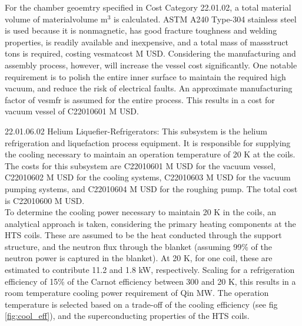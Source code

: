 For the chamber geoemtry specified in Cost Category 22.01.02, a total material volume of materialvolume m$^3$ is calculated. ASTM A240 Type-304 stainless steel is used because it is nonmagnetic, has good fracture toughness and welding properties, is readily available and inexpensive, and a total mass of massstruct tons is required, costing vesmatcost M USD. Considering the manufacturing and assembly process, however, will increase the vessel cost significantly. One notable requirement is to polish the entire inner surface to maintain the required high vacuum, and reduce the risk of electrical faults. An approximate manufacturing factor of vesmfr is assumed for the entire process. This results in a cost for vacuum vessel of C22010601 M USD.\\

\begin{table}[h]
    \centering
    \caption{Vacuum vessel parameters.}
    \label{tab:ves_params}
\end{table}






22.01.06.02 Helium Liquefier-Refrigerators: This subsystem is the helium refrigeration and liquefaction process equipment. It is responsible for supplying the cooling necessary to maintain an operation temperature of 20 K at the coils. \\

The costs for this subsystem are C22010601 M USD for the vacuum vessel, C22010602 M USD for the cooling systems, C22010603 M USD for the vacuum pumping systems, and C22010604 M USD for the roughing pump. The total cost is C22010600 M USD.\\

To determine the cooling power necessary to maintain 20 K in the coils, an analytical approach is taken, considering the primary heating components at the HTS coils. These are assumed to be the heat conducted through the support structure, and the neutron flux through the blanket (assuming 99\% of the neutron power is captured in the blanket). At 20 K, for one coil, these are estimated to contribute 11.2 and 1.8 kW, respectively. Scaling for a refrigeration efficiency of 15\% of the Carnot efficiency between 300 and 20 K, this results in a room temperature cooling power requirement of Qin MW. The operation temperature is selected based on a trade-off of the cooling efficiency (see fig \ref{fig:cool_eff}), and the superconducting properties of the HTS coils.\\


